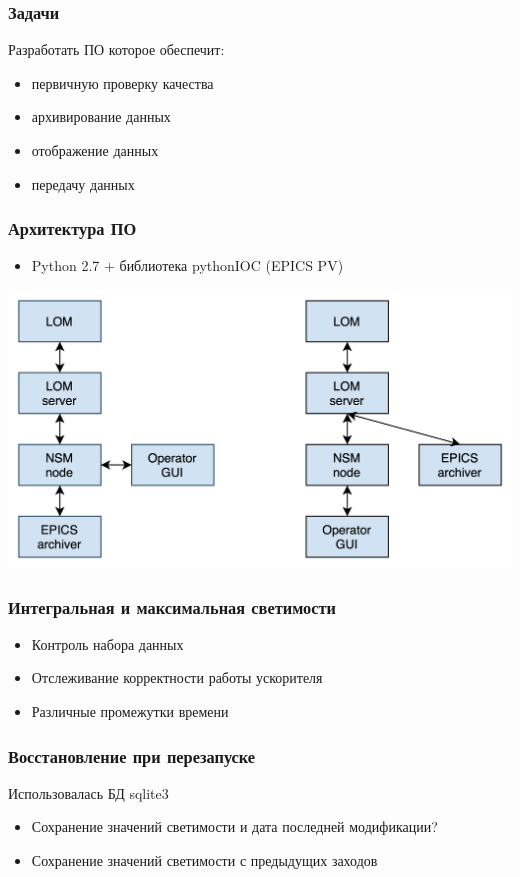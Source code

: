 \documentclass{beamer}
\begin{document}
\begin{frame}
\frametitle{Задачи}
    Разработать ПО которое обеспечит:
    \begin{itemize}
        \item первичную проверку качества
        \item архивирование данных
        \item отображение данных
        \item передачу данных
    \end{itemize}
\end{frame}

\begin{frame}
\frametitle{Архитектура ПО}
    \begin{itemize}
        \item Python 2.7 + библиотека pythonIOC (EPICS PV)
    \end{itemize}
\includegraphics[width=\textwidth]{Architecture.png}
\end{frame}

\begin{frame}
\frametitle{Интегральная и максимальная светимости}
    \begin{itemize}
        \item Контроль набора данных
        \item Отслеживание корректности работы ускорителя
        \item Различные промежутки времени
    \end{itemize}
\end{frame}


\begin{frame}
\frametitle{Восстановление при перезапуске}
    Использовалась БД sqlite3
    \begin{itemize}
        \item Сохранение значений светимости и дата последней модификации?
        \item Сохранение значений светимости с предыдущих заходов
    \end{itemize}
\end{frame}
\end{document}
